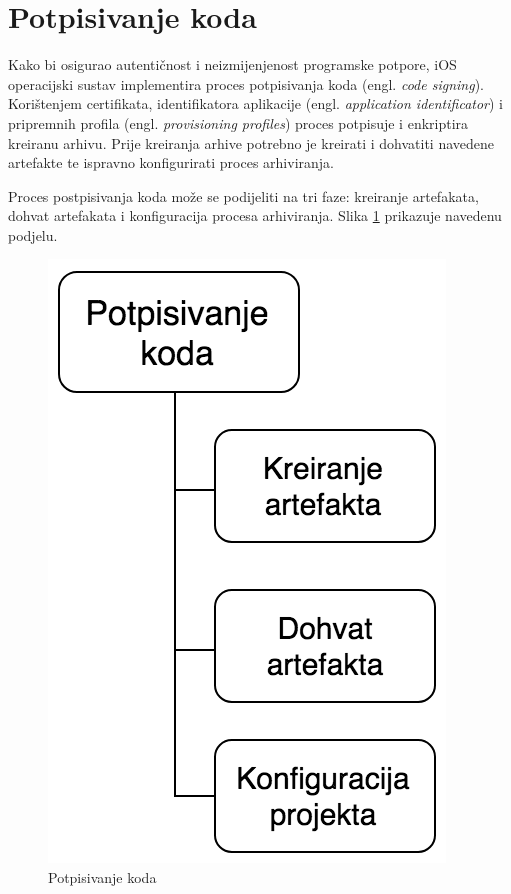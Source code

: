 \documentclass[times, utf8, diplomski, numeric]{fer}
\newcommand{\eng}[1]{(engl. \textit{#1})}
\begin{document}
\section{Potpisivanje koda} \label{header:PotpisivanjeKoda}

Kako bi osigurao autentičnost i neizmijenjenost programske potpore, iOS operacijski sustav implementira proces potpisivanja koda \eng{code signing}. Korištenjem certifikata, identifikatora aplikacije \eng{application identificator} i pripremnih profila \eng{provisioning profiles} proces potpisuje i enkriptira kreiranu arhivu. Prije kreiranja arhive potrebno je kreirati i dohvatiti navedene artefakte te ispravno konfigurirati proces arhiviranja.

Proces postpisivanja koda može se podijeliti na tri faze: kreiranje artefakata, dohvat artefakata i konfiguracija procesa arhiviranja. Slika \ref{fig:CodeSigning} prikazuje navedenu podjelu.

\begin{figure}
\centering
\includegraphics[scale=0.6]{CodeSigning}
\caption{Potpisivanje koda}
\label{fig:CodeSigning}
\end{figure}
\end{document}
